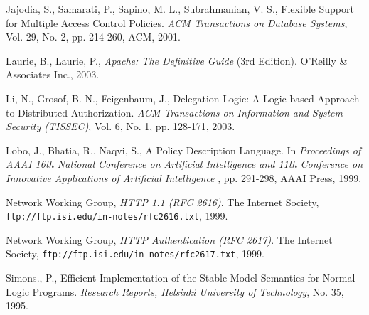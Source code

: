\documentclass[global,twocolumn,draft]{svjour}
\begin{document}
\begin{thebibliography}{5}
      Jajodia, S., Samarati, P., Sapino, M. L., Subrahmanian, V. S.,
      Flexible Support for Multiple Access Control Policies.
      {\em ACM Transactions on Database Systems},
      Vol. 29, No. 2, pp. 214-260, ACM, 2001.

      Laurie, B., Laurie, P.,
      {\em Apache: The Definitive Guide} (3rd Edition).
      O'Reilly \& Associates Inc., 2003.

      Li, N., Grosof, B. N., Feigenbaum, J.,
      Delegation Logic: A Logic-based Approach to Distributed Authorization.
      {\em ACM Transactions on Information and System Security (TISSEC)},
      Vol. 6, No. 1, pp. 128-171, 2003.

      Lobo, J., Bhatia, R., Naqvi, S.,
      A Policy Description Language.
      In {\em Proceedings of AAAI 16th National Conference on Artificial
      Intelligence and 11th Conference on Innovative Applications of Artificial
      Intelligence }, pp. 291-298, AAAI Press, 1999.

      Network Working Group,
      {\em HTTP 1.1 (RFC 2616)}.
      The Internet Society,
      {\tt \scriptsize ftp://ftp.isi.edu/in-notes/rfc2616.txt},
      1999.

      Network Working Group,
      {\em HTTP Authentication (RFC 2617)}.
      The Internet Society,
      {\tt \scriptsize ftp://ftp.isi.edu/in-notes/rfc2617.txt},
      1999.

      Simons., P.,
      Efficient Implementation of the Stable Model Semantics for Normal Logic
      Programs.
      {\em Research Reports, Helsinki University of Technology},
      No. 35, 1995.
  \end{thebibliography}
\end{document}
